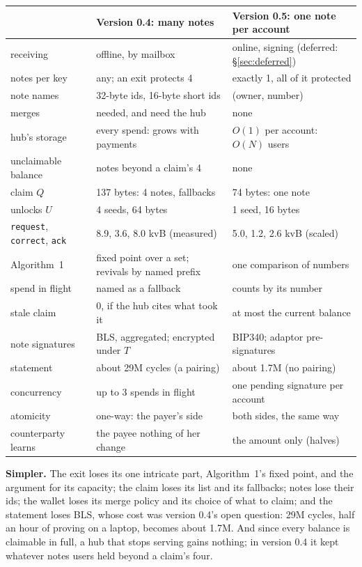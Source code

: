 \documentclass[11pt]{article}
\theoremstyle{plain}
\theoremstyle{definition}
\newcommand{\tx}[1]{\texttt{#1}}
\begin{document}
\begin{center}
\begin{tabularx}{\linewidth}{lLL}
\toprule
& Version 0.4: many notes & Version 0.5: one note per account \\
\midrule
receiving & offline, by mailbox & online, signing (deferred: \S\ref{sec:deferred}) \\
notes per key & any; an exit protects 4 & exactly 1, all of it protected \\
note names & 32-byte ids, 16-byte short ids & (owner, number) \\
merges & needed, and need the hub & none \\
hub's storage & every spend: grows with payments & $O(1)$ per account: $O(N)$ users \\
unclaimable balance & notes beyond a claim's 4 & none \\
claim $Q$ & 137 bytes: 4 notes, fallbacks & 74 bytes: one note \\
unlocks $U$ & 4 seeds, 64 bytes & 1 seed, 16 bytes \\
\tx{request}, \tx{correct}, \tx{ack} & 8.9, 3.6, 8.0 kvB (measured) & 5.0, 1.2, 2.6 kvB (scaled) \\
Algorithm~1 & fixed point over a set; revivals by named prefix & one comparison of numbers \\
spend in flight & named as a fallback & counts by its number \\
stale claim & 0, if the hub cites what took it & at most the current balance \\
note signatures & BLS, aggregated; encrypted under $T$ & BIP340; adaptor pre-signatures \\
statement & about 29M cycles (a pairing) & about 1.7M (no pairing) \\
concurrency & up to 3 spends in flight & one pending signature per account \\
atomicity & one-way: the payer's side & both sides, the same way \\
counterparty learns & the payee nothing of her change & the amount only (halves) \\
\bottomrule
\end{tabularx}
\end{center}

\textbf{Simpler.} The exit loses its one intricate part, Algorithm~1's
fixed point, and the argument for its capacity; the claim loses its
list and its fallbacks; notes lose their ids; the wallet loses its merge
policy and its choice of what to claim; and the statement loses BLS,
whose cost was version 0.4's open question: 29M cycles, half an hour of
proving on a laptop, becomes about 1.7M. And since every balance is
claimable in full, a hub that stops serving gains nothing; in version
0.4 it kept whatever notes users held beyond a claim's four.
\end{document}
